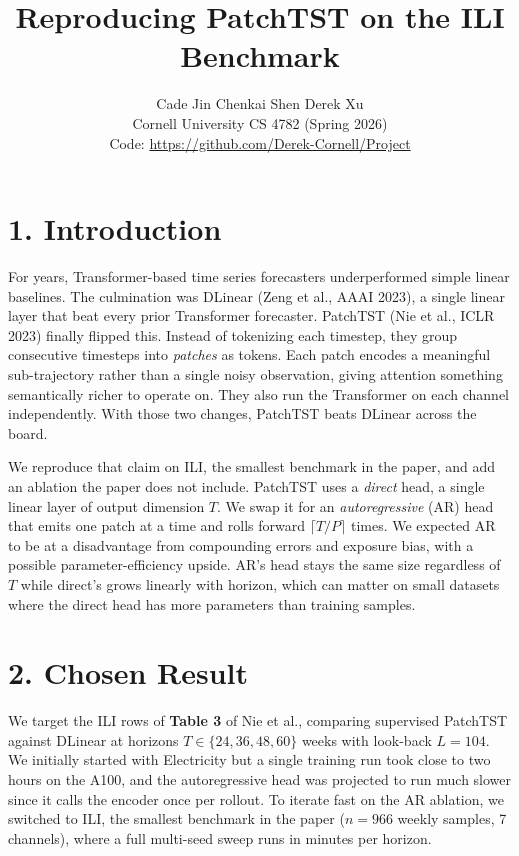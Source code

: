 \documentclass[11pt]{article}
\title{Reproducing PatchTST on the ILI Benchmark}
\author{Cade Jin \quad Chenkai Shen \quad Derek Xu \\
        Cornell University \quad CS 4782 (Spring 2026) \\
        \small Code: \url{https://github.com/Derek-Cornell/Project}}
\date{\vspace{-1.5em}}
\begin{document}
\maketitle
\vspace{-2.5em}

\section*{1. Introduction}
For years, Transformer-based time series forecasters underperformed simple linear baselines. The culmination was DLinear (Zeng et al., AAAI 2023), a single linear layer that beat every prior Transformer forecaster. PatchTST (Nie et al., ICLR 2023) finally flipped this. Instead of tokenizing each timestep, they group consecutive timesteps into \emph{patches} as tokens. Each patch encodes a meaningful sub-trajectory rather than a single noisy observation, giving attention something semantically richer to operate on. They also run the Transformer on each channel independently. With those two changes, PatchTST beats DLinear across the board.

We reproduce that claim on ILI, the smallest benchmark in the paper, and add an ablation the paper does not include. PatchTST uses a \emph{direct} head, a single linear layer of output dimension $T$. We swap it for an \emph{autoregressive} (AR) head that emits one patch at a time and rolls forward $\lceil T/P\rceil$ times. We expected AR to be at a disadvantage from compounding errors and exposure bias, with a possible parameter-efficiency upside. AR's head stays the same size regardless of $T$ while direct's grows linearly with horizon, which can matter on small datasets where the direct head has more parameters than training samples.

\section*{2. Chosen Result}
We target the ILI rows of \textbf{Table 3} of Nie et al., comparing supervised PatchTST against DLinear at horizons $T \in \{24, 36, 48, 60\}$ weeks with look-back $L = 104$. We initially started with Electricity but a single training run took close to two hours on the A100, and the autoregressive head was projected to run much slower since it calls the encoder once per rollout. To iterate fast on the AR ablation, we switched to ILI, the smallest benchmark in the paper ($n{=}966$ weekly samples, 7 channels), where a full multi-seed sweep runs in minutes per horizon.
\end{document}
